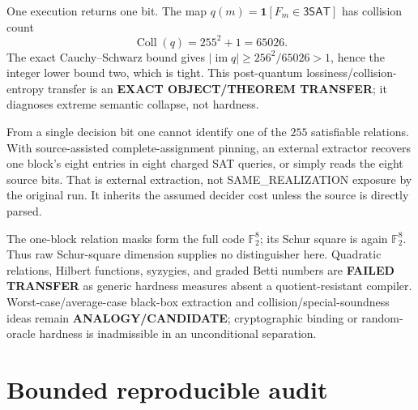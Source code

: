 \documentclass[11pt]{article}
\newcommand{\SAT}{\mathsf{3SAT}}
\begin{document}
One execution returns one bit.  The map $q(m)=\mathbf1[F_m\in\SAT]$ has
collision count
\[
 \operatorname{Coll}(q)=255^2+1=65026.                    \tag{6}
\]
The exact Cauchy--Schwarz bound gives
$|\operatorname{im}q|\ge256^2/65026>1$, hence the integer lower bound two,
which is tight.  This post-quantum lossiness/collision-entropy transfer is an
\textbf{EXACT OBJECT/THEOREM TRANSFER}; it diagnoses extreme semantic
collapse, not hardness.

From a single decision bit one cannot identify one of the $255$ satisfiable
relations.  With source-assisted complete-assignment pinning, an external
extractor recovers one block's eight entries in eight charged SAT queries,
or simply reads the eight source bits.  That is external extraction, not
SAME\_REALIZATION exposure by the original run.  It inherits the assumed
decider cost unless the source is directly parsed.

The one-block relation masks form the full code $\mathbb F_2^8$; its Schur
square is again $\mathbb F_2^8$.  Thus raw Schur-square dimension supplies
no distinguisher here.  Quadratic relations, Hilbert functions, syzygies, and
graded Betti numbers are \textbf{FAILED TRANSFER} as generic hardness
measures absent a quotient-resistant compiler.  Worst-case/average-case
black-box extraction and collision/special-soundness ideas remain
\textbf{ANALOGY/CANDIDATE}; cryptographic binding or random-oracle hardness
is inadmissible in an unconditional separation.

\section{Bounded reproducible audit}
\end{document}
